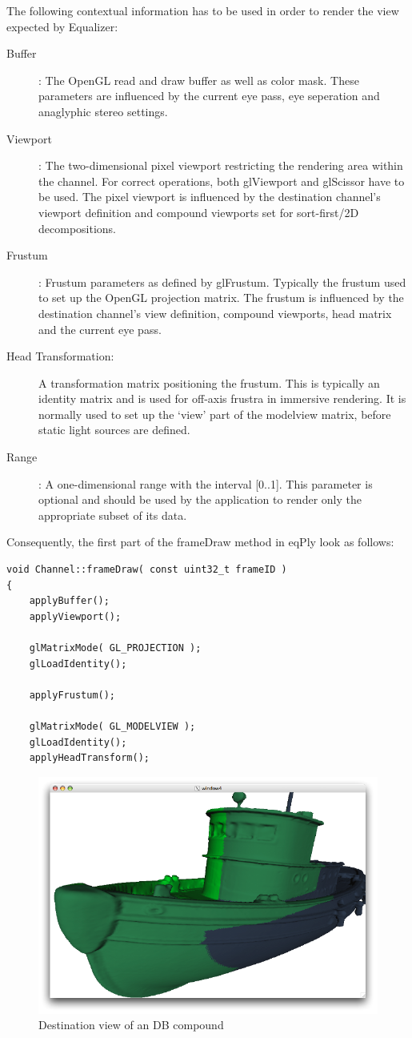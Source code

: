 \documentclass[10pt,a4]{scrartcl}
\begin{document}
The following contextual information has to be used in order to render
the view expected by Equalizer:
\begin{description}
\item[Buffer]: The OpenGL read and draw buffer as well as color mask.
  These parameters are influenced by the current eye pass, eye
  seperation and anaglyphic stereo settings.
\item[Viewport]: The two-dimensional pixel viewport restricting the
  rendering area within the channel. For correct operations, both
  \textsf{glViewport} and \textsf{glScissor} have to be used. The pixel
  viewport is influenced by the destination channel's viewport
  definition and compound viewports set for sort-first/2D decompositions.
\item[Frustum]: Frustum parameters as defined by
  \textsf{glFrustum}. Typically the frustum used to set up the OpenGL
  projection matrix. The frustum is influenced by the destination
  channel's view definition, compound viewports, head matrix and the
  current eye pass.
\item[Head Transformation:] A transformation matrix positioning the
  frustum. This is typically an identity matrix and is used for off-axis
  frustra in immersive rendering. It is normally used to set up the
  `view' part of the modelview matrix, before static light sources are
  defined.
\item[Range]: A one-dimensional range with the interval [0..1]. This
  parameter is optional and should be used by the application to render
  only the appropriate subset of its data.
\end{description}

Consequently, the first part of the \textsf{frameDraw} method in
\textsf{eqPly} look as follows:

{\footnotesize\begin{lstlisting}
void Channel::frameDraw( const uint32_t frameID )
{
    applyBuffer();
    applyViewport();
            
    glMatrixMode( GL_PROJECTION );
    glLoadIdentity();

    applyFrustum();

    glMatrixMode( GL_MODELVIEW );
    glLoadIdentity();
    applyHeadTransform();
\end{lstlisting}}

\begin{figure}
  \includegraphics[width=.4\textwidth]{images/DB.pdf}
  {\caption{\small\label{fDB}Destination view of an DB compound}}
\end{figure}
\end{document}
